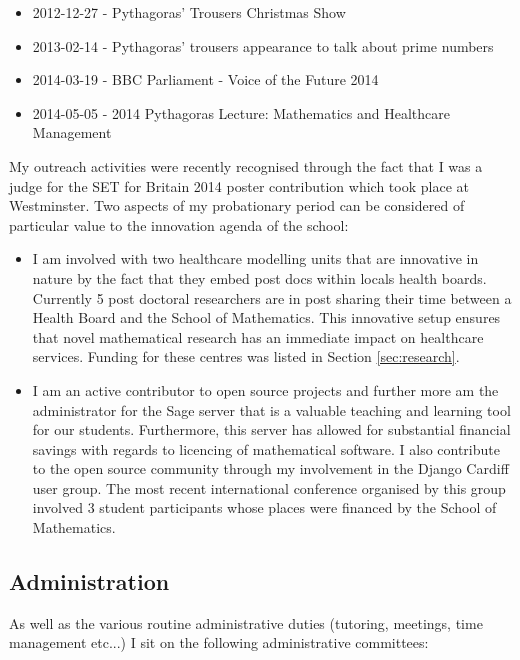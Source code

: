 \documentclass{article}
\begin{document}
\begin{itemize}
    \item 2012-12-27 - Pythagoras' Trousers Christmas Show
    \item 2013-02-14 - Pythagoras' trousers appearance to talk about prime numbers
    \item 2014-03-19 - BBC Parliament - Voice of the Future 2014
    \item 2014-05-05 - 2014 Pythagoras Lecture: Mathematics and Healthcare Management
\end{itemize}

My outreach activities were recently recognised through the fact that I was a judge for the SET for Britain 2014 poster contribution which took place at Westminster.
Two aspects of my probationary period can be considered of particular value to the innovation agenda of the school:

\begin{itemize}
    \item I am involved with two healthcare modelling units that are innovative in nature by the fact that they embed post docs within locals health boards.
          Currently 5 post doctoral researchers are in post sharing their time between a Health Board and the School of Mathematics.
          This innovative setup ensures that novel mathematical research has an immediate impact on healthcare services.
          Funding for these centres was listed in Section \ref{sec:research}.
    \item I am an active contributor to open source projects and further more am the administrator for the Sage server that is a valuable teaching and learning tool for our students.
          Furthermore, this server has allowed for substantial financial savings with regards to licencing of mathematical software.
          I also contribute to the open source community through my involvement in the Django Cardiff user group.
          The most recent international conference organised by this group involved 3 student participants whose places were financed by the School of Mathematics.
\end{itemize}

\subsection{Administration}

As well as the various routine administrative duties (tutoring, meetings, time management etc...) I sit on the following administrative committees:
\end{document}
